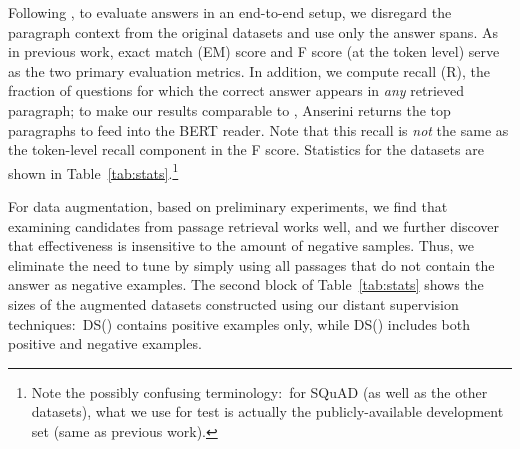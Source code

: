 \documentclass[11pt,a4paper]{article}
\begin{document}
Following \citet{yang2019end}, to evaluate answers in an end-to-end setup, we disregard the paragraph context from the original datasets and use only the answer spans.
As in previous work, exact match (EM) score and F score (at the token level) serve as the two primary evaluation metrics.
In addition, we compute recall (R), the fraction of questions for which the correct answer appears in {\it any} retrieved paragraph; to make our results comparable to \citet{yang2019end}, Anserini returns the top  paragraphs to feed into the BERT reader.
Note that this recall is {\it not} the same as the token-level recall component in the F score.
Statistics for the datasets are shown in Table~\ref{tab:stats}.\footnote{Note the possibly confusing terminology:\ for SQuAD (as well as the other datasets), what we use for test is actually the publicly-available development set (same as previous work).}

\begin{table}[t]
\centering\centering{}
\label{tab:stats}
\caption{Number of examples in each dataset. A example means a paragraph-question pair.}
\end{table}

For data augmentation, based on preliminary experiments, we find that examining  candidates from passage retrieval works well, and we further discover that effectiveness is insensitive to the amount of negative samples.
Thus, we eliminate the need to tune  by simply using all passages that do not contain the answer as negative examples.
The second block of Table~\ref{tab:stats} shows the sizes of the augmented datasets constructed using our distant supervision techniques:\ DS() contains positive examples only, while DS() includes both positive and negative examples.
\end{document}
